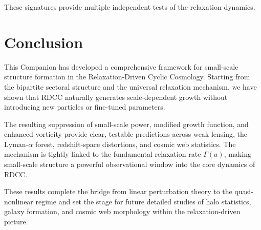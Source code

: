 \documentclass[11pt,a4paper]{article}
\begin{document}
These signatures provide multiple independent tests of the relaxation dynamics.

\section{Conclusion}

This Companion has developed a comprehensive framework for small-scale structure
formation in the Relaxation-Driven Cyclic Cosmology. Starting from the bipartite sectoral
structure and the universal relaxation mechanism, we have shown that RDCC naturally
generates scale-dependent growth without introducing new particles or fine-tuned
parameters.

The resulting suppression of small-scale power, modified growth function, and enhanced
vorticity provide clear, testable predictions across weak lensing, the Lyman-$\alpha$ forest,
redshift-space distortions, and cosmic web statistics. The mechanism is tightly linked to
the fundamental relaxation rate $\Gamma(a)$, making small-scale structure a powerful
observational window into the core dynamics of RDCC.

These results complete the bridge from linear perturbation theory to the quasi-nonlinear
regime and set the stage for future detailed studies of halo statistics, galaxy formation,
and cosmic web morphology within the relaxation-driven picture.
\end{document}
